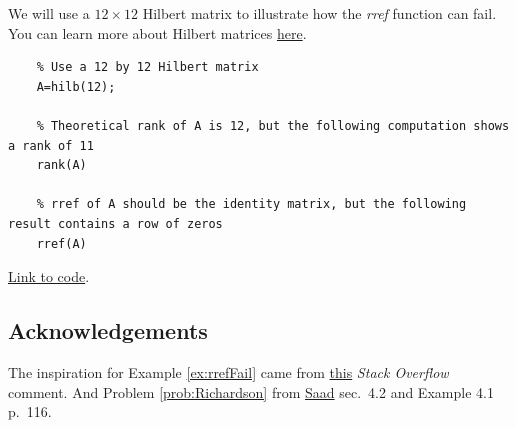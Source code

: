 \documentclass{ximera}
\begin{document}
\begin{example}\label{ex:rrefFail}
    We will use a $12\times 12$ Hilbert matrix to illustrate how the \emph{rref} function can fail.  You can learn more about Hilbert matrices \href{https://en.wikipedia.org/wiki/Hilbert_matrix}{here}.
 
    \begin{verbatim}
    % Use a 12 by 12 Hilbert matrix
    A=hilb(12);
 
    % Theoretical rank of A is 12, but the following computation shows a rank of 11
    rank(A)
 
    % rref of A should be the identity matrix, but the following result contains a row of zeros
    rref(A)
    \end{verbatim}
 
    \href{https://sagecell.sagemath.org/?z=eJxtjjEOwjAMRfdKuYOXSkViSVfE0I0DwAGS1iUWaYwSR6WcnrSFjcWyrP_fcw23hGBAt2CXdV7IW4wCk5FIL1V1Z1cujW4PJ1WpqoarQ44o1BsP0YQH8AgdUCrlI9gsIA5hZO95pnCHnqdnFiPEAZLjORXZr6a1qta96Q47O0Ycd16JZj-AxQ1HAwYhWb5f_fNETNlL0QUxFDYLzyvrjZFT8RR08XwAMi9N1g==&lang=octave&interacts=eJyLjgUAARUAuQ==}{Link to code}.
 
\end{example}
 
\subsection*{Acknowledgements}
 
The inspiration for Example \ref{ex:rrefFail} came from \href{https://stackoverflow.com/questions/42893111/matlab-rref-function-precision-error-after-12th-column-of-hilbert-matrices}{this} \emph{Stack Overflow} comment. And Problem \ref{prob:Richardson} from \href{https://www-users.cse.umn.edu/~saad/IterMethBook_2ndEd.pdf}{Saad} sec.~4.2 and Example 4.1 p.~116. 
 
 
\end{document}
